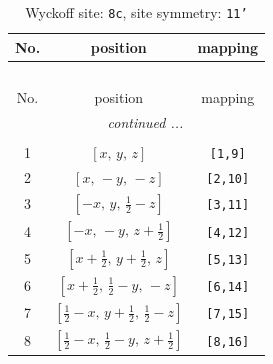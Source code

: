 \documentclass[fleqn,8pt]{jsarticle}
\begin{document}
\renewcommand{\arraystretch}{1.2}
\begin{longtable}{ccc}
\caption{Wyckoff site: {\tt 8c}, site symmetry: {\tt 11'}}
 \\
 \hline \hline
No. & position & mapping \\ \hline \endfirsthead

\multicolumn{2}{l}{\tablename\ \thetable{}} \\
 \hline \hline
No. & position & mapping \\ \hline \endhead

 \hline \hline
\multicolumn{2}{r}{\footnotesize\it continued ...} \\ \endfoot

 \hline \hline
\multicolumn{2}{r}{} \\ \endlastfoot

1 & $\left[ x,\, y,\, z \right]$ & {\tt [1,9]} \\ \hline
2 & $\left[ x,\, - y,\, - z \right]$ & {\tt [2,10]} \\ \hline
3 & $\left[ - x,\, y,\, \frac{1}{2} - z \right]$ & {\tt [3,11]} \\ \hline
4 & $\left[ - x,\, - y,\, z + \frac{1}{2} \right]$ & {\tt [4,12]} \\ \hline
5 & $\left[ x + \frac{1}{2},\, y + \frac{1}{2},\, z \right]$ & {\tt [5,13]} \\ \hline
6 & $\left[ x + \frac{1}{2},\, \frac{1}{2} - y,\, - z \right]$ & {\tt [6,14]} \\ \hline
7 & $\left[ \frac{1}{2} - x,\, y + \frac{1}{2},\, \frac{1}{2} - z \right]$ & {\tt [7,15]} \\ \hline
8 & $\left[ \frac{1}{2} - x,\, \frac{1}{2} - y,\, z + \frac{1}{2} \right]$ & {\tt [8,16]} \\
\end{longtable}
\end{document}
